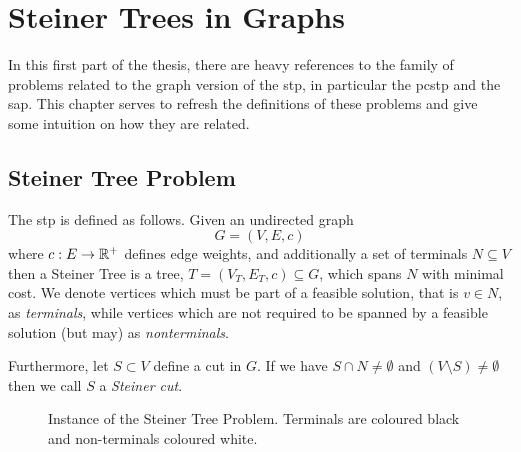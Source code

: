 \chapter{Steiner Trees in Graphs}
\label{chap:steiner-trees}

In this first part of the thesis, there are heavy references to the family of problems related to the
graph version of the \gls{stp}, in particular the \gls{pcstp} and the \gls{sap}.
This chapter serves to refresh the definitions of these
problems and give some intuition on how they are related.

\section{Steiner Tree Problem}
The \gls{stp} is defined as follows.
Given an undirected graph
\[G = (V, E, c)\]
 where $c: E \to \mathbb{R}^+$ defines edge weights, and additionally a set of terminals $N \subseteq V$ then
a Steiner Tree is a tree, $T = (V_T, E_T, c) \subseteq G$, which spans $N$ with minimal cost. We denote vertices which must be part of a feasible solution,
that is $v \in N$, as \textit{terminals}, while vertices which are not required to be spanned by a feasible solution (but may) as \textit{nonterminals}.

Furthermore, let $S \subset V$ define a cut in $G$. If we have $S \cap N \neq \emptyset$ and $(V \setminus S) \neq \emptyset$ then we
 call $S$ a \textit{Steiner cut}.

\begin{figure}[h]\centering
{}
\caption{Instance of the Steiner Tree Problem. Terminals are coloured black and non-terminals coloured white.}
\label{fig:stp:01}
\end{figure}

